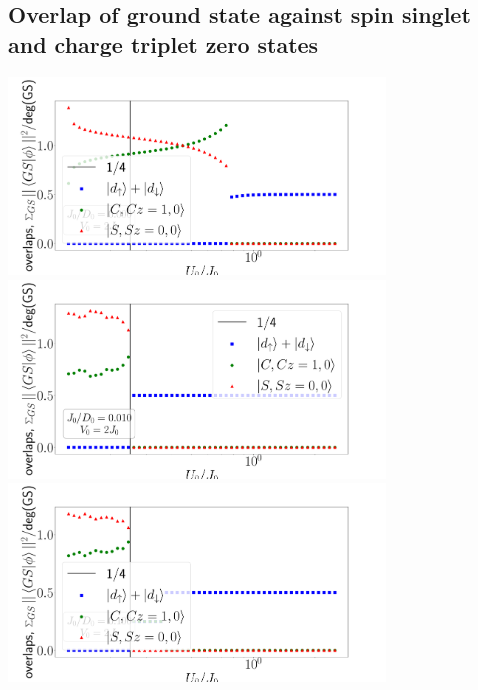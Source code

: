 \documentclass{report}
\numberwithin{equation}{section}
\begin{document}
\subsection*{Overlap of ground state against spin singlet and charge triplet zero states}
\begin{center}
	\includegraphics[width=0.75\textwidth]{../figures/overlaps_gs-J=0.050.pdf}\\
	\includegraphics[width=0.75\textwidth]{../figures/overlaps_gs-J=5.000.pdf}\\
	\includegraphics[width=0.75\textwidth]{../figures/overlaps_gs-J=50.000.pdf}
\end{center}
\end{document}
